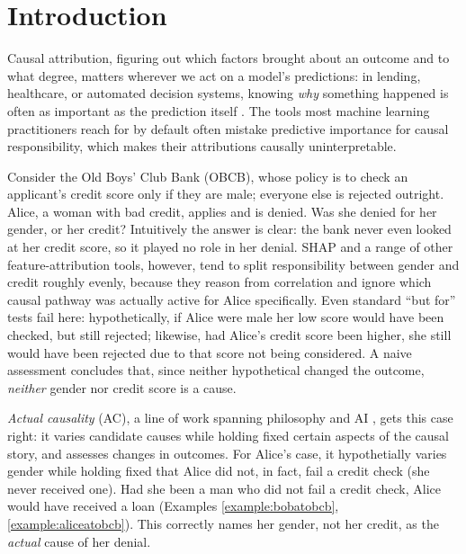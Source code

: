 \section{Introduction}
\label{sec:intro}

Causal attribution, figuring out which factors brought about an outcome and to what degree, matters wherever we act on a model's predictions: in lending,
healthcare, or automated decision systems, knowing \emph{why} something happened is
often as important as the prediction itself
\citep{Shepherd2024,CheshireMagrini2009,Papageorgiou2022,HeckmanPinto2022CausalPolicyAnalysis}.
The tools most machine learning practitioners reach for by default often mistake
predictive importance for causal responsibility, which makes their attributions
causally uninterpretable.

Consider the Old Boys' Club Bank (OBCB), whose policy is to check an applicant's
credit score only if they are male; everyone else is rejected outright. Alice, a
woman with bad credit, applies and is denied. Was she denied for her gender,
or her credit? Intuitively the answer is clear: the bank never even looked 
at her credit score, so it played no role in her denial. 
SHAP \citep{lundberg2017unified} and a range of other feature-attribution tools,
however, tend to split responsibility between gender and credit roughly evenly, because they
reason from correlation and ignore which causal pathway was actually active for
Alice specifically. Even standard ``but for'' tests fail here: hypothetically, if Alice were male her low score would have been checked, but still rejected; likewise, had Alice's credit score been higher, she still would have been rejected due to that score not being considered. A naive assessment concludes that, since neither hypothetical changed the outcome, \textit{neither} gender nor credit score is a cause. %

\emph{Actual causality} (AC), a line of work spanning philosophy and AI
\citep{actualCausalityHalpern}, gets this case right: it varies candidate causes while holding fixed certain aspects of the causal story, and assesses changes in outcomes. For Alice's case, it hypothetially varies gender while holding fixed that Alice did not, in fact, fail a credit check (she never received one). Had she been a man who did not fail a credit check, Alice would have received a loan (Examples \ref{example:bobatobcb}, \ref{example:aliceatobcb}).
This correctly names her gender, not her credit, as the \textit{actual} cause of her denial. 

